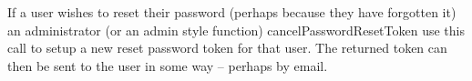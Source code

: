 If a user wishes to reset their password (perhaps because they have forgotten it) an administrator (or an admin style function) cancelPasswordResetToken
use this call to setup a new reset password token for that user. The returned token can then be sent to the user in some way -- perhaps by email.
